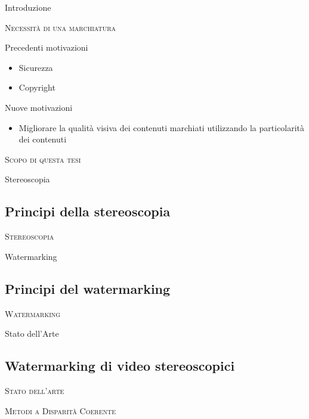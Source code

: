 \documentclass{beamer}
\begin{document}
\begin{section}{Introduzione}
\begin{frame}[t]{\textsc{Necessit\`{a} di una marchiatura}}
\begin{center}
\begin{block}{Precedenti motivazioni}
\begin{itemize}
\item  Sicurezza
\item  Copyright
\end{itemize}
\end{block}
\vspace{2em}
\begin{block}{Nuove motivazioni}
\begin{itemize}
\item Migliorare la qualit\`{a} visiva dei contenuti marchiati utilizzando la particolarit\`{a} dei contenuti
\end{itemize}
\end{block}
\end{center}
\end{frame}


\begin{frame}[t]{\textsc{Scopo di questa tesi}}


\end{frame}

\end{section}

\begin{section}{Stereoscopia}
\subsection{Principi della stereoscopia}
\begin{frame}[t]{\textsc{Stereoscopia}}

\end{frame}

\end{section}


\begin{section}{Watermarking}
\subsection {Principi del watermarking}
\begin{frame}[t]{\textsc{Watermarking}}

\end{frame}


\end{section}
\begin{section}{Stato dell'Arte}
\subsection{Watermarking di video stereoscopici}
\begin{frame}[t]{\textsc{Stato dell'arte}}

\end{frame}

\begin{frame}[t]{\textsc{Metodi a Disparit\`{a} Coerente}}
\end{frame}

\end{section}
\end{document}
